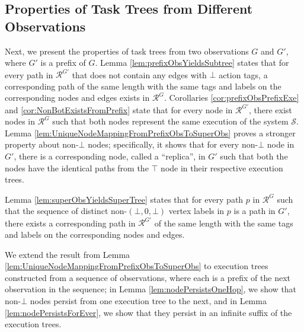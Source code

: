 \documentclass[11pt]{article}
\numberwithin{theorem}{section}
\begin{document}
\subsection{Properties of Task Trees from Different Observations}\label{subset:PropertiesOfTreesFromPrefixObservations}
Next, we present the properties of task trees from two observations $G$ and $G'$, where $G'$ is a prefix of $G$. Lemma \ref{lem:prefixObsYieldsSubtree} states that for every path in $\mathcal{R}^{G'}$ that does not contain any edges with $\bot$ action tags, a corresponding path of the same length with the same tags and labels on the corresponding nodes and edges exists in $\mathcal{R}^{G}$. Corollaries \ref{cor:prefixObsPrefixExe} and \ref{cor:NonBotExistsFromPrefix} state that for every node in $\mathcal{R}^{G'}$, there exist nodes in $\mathcal{R}^{G}$ such that both nodes represent the same execution of the system $\mathcal{S}$. Lemma \ref{lem:UniqueNodeMappingFromPrefixObsToSuperObs} proves a stronger property about non-$\bot$ nodes; specifically, it shows that for every non-$\bot$ node in $G'$, there is a corresponding node, called a ``replica'', in $G'$ such that both the nodes have the identical paths from the $\top$ node in their respective execution trees.

Lemma \ref{lem:superObsYieldsSuperTree} states that for every path $p$ in $\mathcal{R}^G$ such that the sequence of distinct non-$(\bot,0,\bot)$ vertex labels in $p$ is a path in $G'$, there exists a corresponding path in $\mathcal{R}^{G'}$ of the same length with the same tags and labels on the corresponding nodes and edges. 

We extend the result from Lemma \ref{lem:UniqueNodeMappingFromPrefixObsToSuperObs} to execution trees constructed from a sequence of observations, where each is a prefix of the next observation in the sequence; in Lemma \ref{lem:nodePersistsOneHop}, we show that non-$\bot$ nodes persist from one execution tree to the next, and in Lemma \ref{lem:nodePersistsForEver}, we show that they persist in an infinite suffix of the execution trees. 
\end{document}
